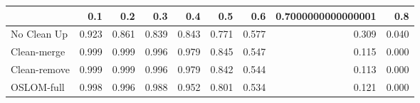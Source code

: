 \begin{tabular}{lrrrrrrrr}
\toprule
{} &   0.1 &   0.2 &   0.3 &   0.4 &   0.5 &   0.6 & 0.7000000000000001 &   0.8 \\
\midrule
No Clean Up  & 0.923 & 0.861 & 0.839 & 0.843 & 0.771 & 0.577 &              0.309 & 0.040 \\
Clean-merge  & 0.999 & 0.999 & 0.996 & 0.979 & 0.845 & 0.547 &              0.115 & 0.000 \\
Clean-remove & 0.999 & 0.999 & 0.996 & 0.979 & 0.842 & 0.544 &              0.113 & 0.000 \\
OSLOM-full   & 0.998 & 0.996 & 0.988 & 0.952 & 0.801 & 0.534 &              0.121 & 0.000 \\
\bottomrule
\end{tabular}
